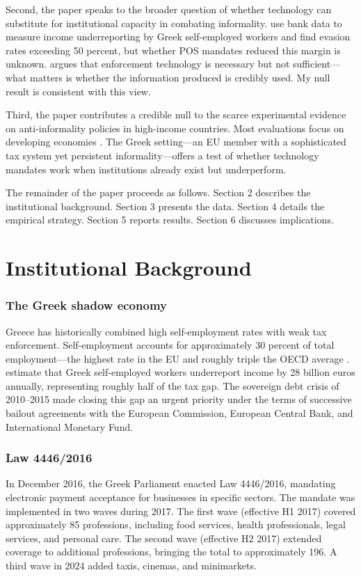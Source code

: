 \documentclass[12pt]{article}
\begin{document}
Second, the paper speaks to the broader question of whether technology can substitute for institutional capacity in combating informality. \citet{artavanis2016measuring} use bank data to measure income underreporting by Greek self-employed workers and find evasion rates exceeding 50 percent, but whether POS mandates reduced this margin is unknown. \citet{kleven2016can} argues that enforcement technology is necessary but not sufficient---what matters is whether the information produced is credibly used. My null result is consistent with this view.

Third, the paper contributes a credible null to the scarce experimental evidence on anti-informality policies in high-income countries. Most evaluations focus on developing economies \citep{de2018informality, ulyssea2020firms}. The Greek setting---an EU member with a sophisticated tax system yet persistent informality---offers a test of whether technology mandates work when institutions already exist but underperform.

The remainder of the paper proceeds as follows. Section 2 describes the institutional background. Section 3 presents the data. Section 4 details the empirical strategy. Section 5 reports results. Section 6 discusses implications.


\section{Institutional Background}

\subsubsection*{The Greek shadow economy} Greece has historically combined high self-employment rates with weak tax enforcement. Self-employment accounts for approximately 30 percent of total employment---the highest rate in the EU and roughly triple the OECD average \citep{oecd2019employment}. \citet{artavanis2016measuring} estimate that Greek self-employed workers underreport income by 28 billion euros annually, representing roughly half of the tax gap. The sovereign debt crisis of 2010--2015 made closing this gap an urgent priority under the terms of successive bailout agreements with the European Commission, European Central Bank, and International Monetary Fund.

\subsubsection*{Law 4446/2016} In December 2016, the Greek Parliament enacted Law 4446/2016, mandating electronic payment acceptance for businesses in specific sectors. The mandate was implemented in two waves during 2017. The first wave (effective H1 2017) covered approximately 85 professions, including food services, health professionals, legal services, and personal care. The second wave (effective H2 2017) extended coverage to additional professions, bringing the total to approximately 196. A third wave in 2024 added taxis, cinemas, and minimarkets.
\end{document}
